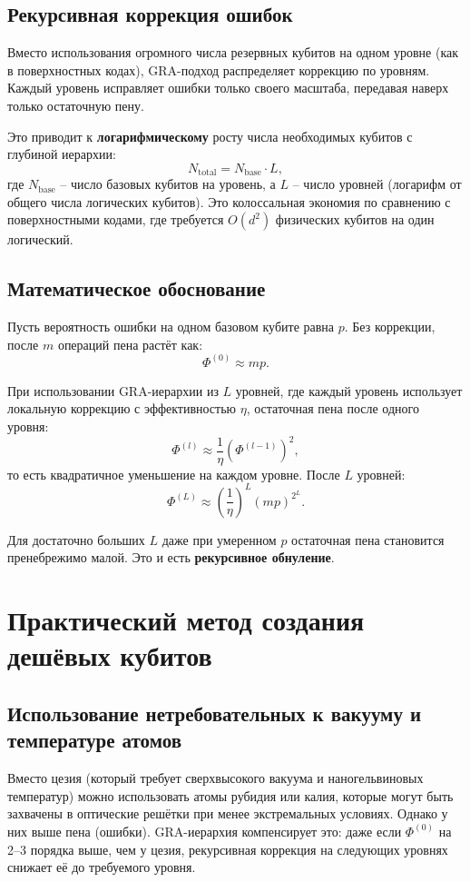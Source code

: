 \documentclass[12pt,a4paper]{article}
\begin{document}
\subsection{Рекурсивная коррекция ошибок}

Вместо использования огромного числа резервных кубитов на одном уровне (как в поверхностных кодах), GRA-подход распределяет коррекцию по уровням. Каждый уровень исправляет ошибки только своего масштаба, передавая наверх только остаточную пену.

Это приводит к \textbf{логарифмическому} росту числа необходимых кубитов с глубиной иерархии:
\[
N_{\text{total}} = N_{\text{base}} \cdot L,
\]
где \(N_{\text{base}}\) – число базовых кубитов на уровень, а \(L\) – число уровней (логарифм от общего числа логических кубитов). Это колоссальная экономия по сравнению с поверхностными кодами, где требуется \(O(d^2)\) физических кубитов на один логический.

\subsection{Математическое обоснование}

Пусть вероятность ошибки на одном базовом кубите равна \(p\). Без коррекции, после \(m\) операций пена растёт как:
\[
\Phi^{(0)} \approx m p.
\]

При использовании GRA-иерархии из \(L\) уровней, где каждый уровень использует локальную коррекцию с эффективностью \(\eta\), остаточная пена после одного уровня:
\[
\Phi^{(l)} \approx \frac{1}{\eta} \left( \Phi^{(l-1)} \right)^2,
\]
то есть квадратичное уменьшение на каждом уровне. После \(L\) уровней:
\[
\Phi^{(L)} \approx \left( \frac{1}{\eta} \right)^{L} (m p)^{2^L}.
\]

Для достаточно больших \(L\) даже при умеренном \(p\) остаточная пена становится пренебрежимо малой. Это и есть \textbf{рекурсивное обнуление}.

\section{Практический метод создания дешёвых кубитов}

\subsection{Использование нетребовательных к вакууму и температуре атомов}

Вместо цезия (который требует сверхвысокого вакуума и наногельвиновых температур) можно использовать атомы рубидия или калия, которые могут быть захвачены в оптические решётки при менее экстремальных условиях. Однако у них выше пена (ошибки). GRA-иерархия компенсирует это: даже если \(\Phi^{(0)}\) на 2–3 порядка выше, чем у цезия, рекурсивная коррекция на следующих уровнях снижает её до требуемого уровня.
\end{document}

